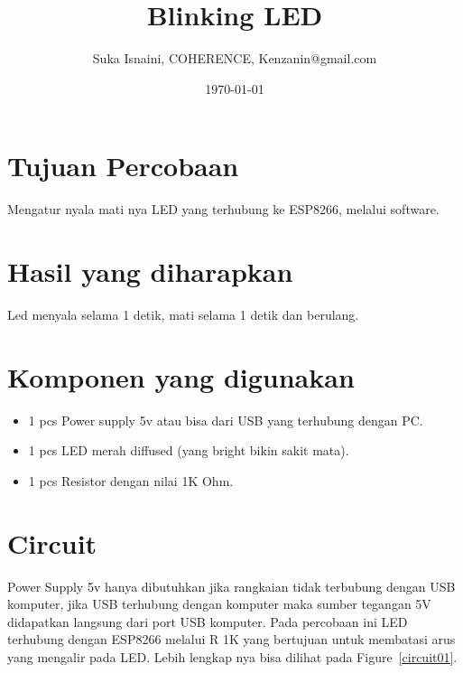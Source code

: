 
\def \TITLE     {Blinking LED}
\def \AUTHOR    {Suka Isnaini, COHERENCE, Kenzanin@gmail.com}
\def \SUBJECT   {ESP8266}
\def \KEYWORDS  {Python, Python-PIP, PlatformIO}





\title{\TITLE}

\author{\AUTHOR}

\date{\today}

\maketitle
\tableofcontents
\newpage

\section{Tujuan Percobaan}
Mengatur nyala mati nya LED yang terhubung ke ESP8266, melalui software.

\section{Hasil yang diharapkan}
Led menyala selama 1 detik, mati selama 1 detik dan berulang.

\section{Komponen yang digunakan}
\begin{itemize}
\item 1 pcs Power supply 5v atau bisa dari USB yang terhubung dengan PC.
\item 1 pcs LED merah diffused (yang bright bikin sakit mata).
\item 1 pcs Resistor dengan nilai 1K Ohm.
\end{itemize}

\section{Circuit}
Power Supply 5v hanya dibutuhkan jika rangkaian tidak terbubung dengan USB komputer, jika USB terhubung dengan komputer maka sumber tegangan 5V didapatkan langsung dari port USB komputer. Pada percobaan ini LED terhubung dengan ESP8266 melalui R 1K yang bertujuan untuk membatasi arus yang mengalir pada LED. Lebih lengkap nya bisa dilihat pada Figure~\ref{circuit01}.

